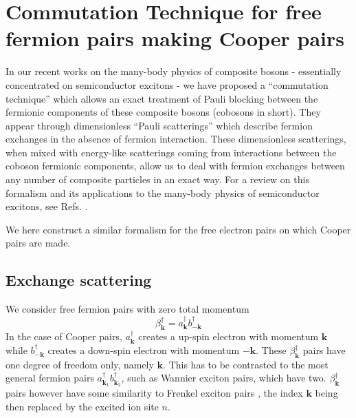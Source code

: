 \documentclass[aps,prb,superscriptaddress,showpacs,reprint,lengthcheck]{revtex4}
\newcommand{\vk}{\ensuremath{\mathbf{k}}}
\begin{document}
\section{Commutation Technique for free fermion pairs making Cooper pairs\label{sec:beta}}

In our recent works on the many-body physics of composite bosons - essentially concentrated on semiconductor excitons - we have
proposed a ``commutation technique'' which allows an exact treatment of Pauli blocking between the fermionic components of these composite
bosons (cobosons in short). They appear through dimensionless ``Pauli scatterings'' which describe fermion
exchanges in the absence of fermion interaction. These dimensionless
scatterings, when mixed with energy-like scatterings coming from interactions
between the coboson fermionic components, allow us to deal with fermion exchanges
between any number of composite particles in an exact way. For a review on
this formalism and its applications to the many-body physics of
semiconductor excitons, see Refs. \cite%
{CobosonPhysicsReports}.

We here construct a similar formalism for the free electron pairs on which Cooper pairs are made.


\subsection{Exchange scattering}

We consider free fermion pairs with zero total
momentum 
\begin{equation}
\beta^{\dagger}_\vk=a^{\dagger}_{\mathbf{k} }b^{\dagger}_{-\mathbf{k} }
\end{equation}
 In the case of Cooper pairs, $a^{\dagger}_{\mathbf{k} }$ creates a  up-spin electron with momentum $\mathbf{k}$ while $b^{\dagger}_{\mathbf{-k} }$ creates a down-spin electron with momentum $\mathbf{-k}$. These $\beta^{\dagger}_\vk$ pairs have one degree of freedom
only, namely $\mathbf{k}$. This has to be  contrasted to the
most general fermion pairs $a^{\dagger}_{\mathbf{k} _1}b^{\dagger}_{\mathbf{k%
} _2}$, such as Wannier exciton pairs, which have two. $\beta^{\dagger}_\vk$ pairs however have  some similarity to Frenkel exciton pairs \cite{frenkel}, the index $\mathbf{k}$ being then replaced by the excited ion site $n$. 
\end{document}
